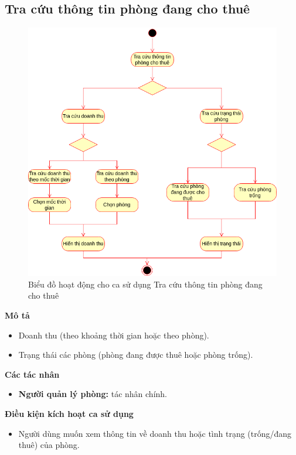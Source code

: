 \subsection{Tra cứu thông tin phòng đang cho thuê}
\begin{figure}[H]
    \centering
    \includegraphics[width=\textwidth]{img/1.Việt-Tra cứu thông tin phòng đang cho thuê.drawio.png}
    \caption{Biểu đồ hoạt động cho ca sử dụng Tra cứu thông tin phòng đang cho thuê}
\end{figure}
\textbf{\indent Mô tả}
\begin{itemize}
    \item Doanh thu (theo khoảng thời gian hoặc theo phòng).
    \item Trạng thái các phòng (phòng đang được thuê hoặc phòng trống).
\end{itemize}

\textbf{Các tác nhân}
\begin{itemize}
    \item \textbf{Người quản lý phòng:} tác nhân chính.
\end{itemize}

\textbf{Điều kiện kích hoạt ca sử dụng}
\begin{itemize}
    \item Người dùng muốn xem thông tin về doanh thu hoặc tình trạng (trống/đang thuê) của phòng.
\end{itemize}

